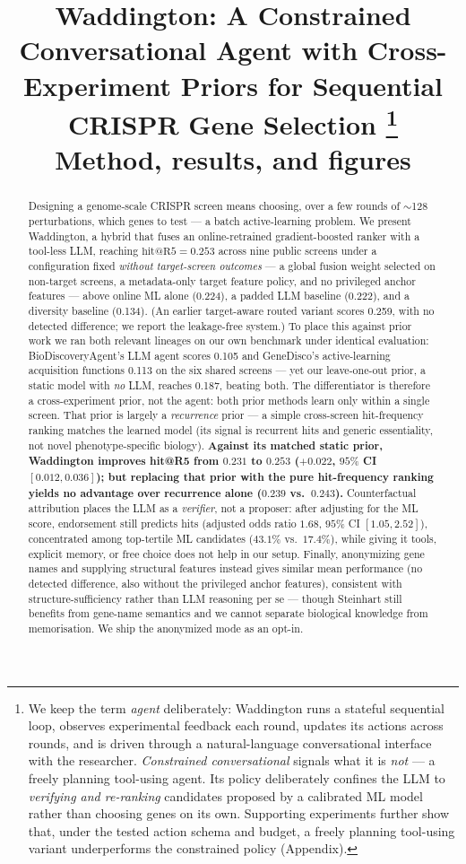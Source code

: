 \documentclass[11pt]{article}
\title{Waddington: A Constrained Conversational Agent with Cross-Experiment Priors for Sequential CRISPR Gene Selection%
\thanks{We keep the term \emph{agent} deliberately: Waddington runs a stateful sequential loop, observes
experimental feedback each round, updates its actions across rounds, and is driven through a
natural-language conversational interface with the researcher. \emph{Constrained conversational}
signals what it is \emph{not} --- a freely planning tool-using agent. Its policy deliberately confines the
LLM to \emph{verifying and re-ranking} candidates proposed by a calibrated ML model rather than choosing
genes on its own. Supporting experiments further show that, under the tested action schema and budget, a
freely planning tool-using variant underperforms the constrained policy (Appendix).}\\
\large Method, results, and figures}
\date{}
\begin{document}
\maketitle

\begin{abstract}
\noindent
Designing a genome-scale CRISPR screen means choosing, over a few rounds of $\sim$128 perturbations,
which genes to test --- a batch active-learning problem. We present Waddington, a hybrid that fuses an
online-retrained gradient-boosted ranker with a tool-less LLM, reaching $\mathrm{hit@R5}=0.253$ across
nine public screens under a configuration fixed \emph{without target-screen outcomes} --- a global fusion
weight selected on non-target screens, a metadata-only target feature policy, and no privileged anchor
features --- above online ML alone (0.224), a padded LLM baseline (0.222), and a diversity baseline (0.134).
(An earlier target-aware routed variant scores 0.259, with no detected difference; we report the
leakage-free system.) To place this against prior work we ran both relevant lineages on our own benchmark
under identical evaluation: BioDiscoveryAgent's LLM agent scores 0.105 and GeneDisco's active-learning
acquisition functions 0.113 on the six shared screens --- yet our leave-one-out prior, a static model
with \emph{no} LLM, reaches 0.187, beating both. The differentiator is therefore a cross-experiment
prior, not the agent: both prior methods learn only within a single screen. That prior is largely a
\emph{recurrence} prior --- a simple cross-screen hit-frequency ranking matches the learned model (its
signal is recurrent hits and generic essentiality, not novel phenotype-specific biology). \textbf{Against
its matched static prior, Waddington improves hit@R5 from $0.231$ to $0.253$ ($+0.022$, $95\%$ CI
$[0.012, 0.036]$); but replacing that prior with the pure hit-frequency ranking yields no advantage over
recurrence alone ($0.239$ vs.\ $0.243$).} Counterfactual attribution places the LLM as a \emph{verifier},
not a proposer: after adjusting for the ML score, endorsement still predicts hits (adjusted odds ratio
$1.68$, $95\%$ CI $[1.05, 2.52]$), concentrated among top-tertile ML candidates ($43.1\%$ vs.\ $17.4\%$),
while giving it tools, explicit memory, or free choice does not help in our setup. Finally, anonymizing
gene names and supplying structural features instead gives similar mean performance (no detected
difference, also without the privileged anchor features), consistent with structure-sufficiency rather
than LLM reasoning per se --- though Steinhart still benefits from gene-name semantics and we cannot
separate biological knowledge from memorisation. We ship the anonymized mode as an opt-in.
\end{abstract}
\end{document}
